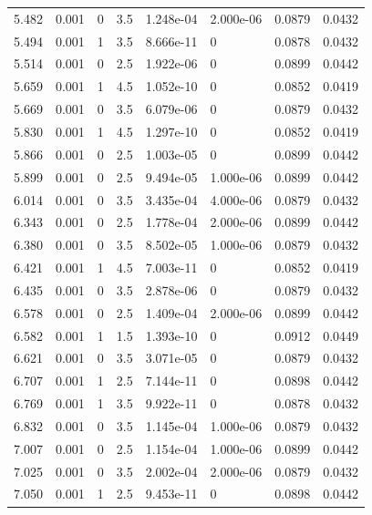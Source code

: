 \documentclass[preview]{standalone}
\begin{document}
{{{\begin{tabular}{L{1.2cm}C{1.2cm} C{0.3cm}C{0.5cm} C{1.4cm}C{1.4cm} C{1.4cm}C{1.4cm}}
  5.482  &  0.001  & 0     & 3.5 &  1.248e-04  & 2.000e-06  & 0.0879 &  0.0432   \\ 
  5.494  &  0.001  & 1     & 3.5 &  8.666e-11  & 0  & 0.0878 &  0.0432   \\ 
  5.514  &  0.001  & 0     & 2.5 &  1.922e-06  & 0  & 0.0899 &  0.0442   \\ 
  5.659  &  0.001  & 1     & 4.5 &  1.052e-10  & 0  & 0.0852 &  0.0419   \\ 
  5.669  &  0.001  & 0     & 3.5 &  6.079e-06  & 0  & 0.0879 &  0.0432   \\ 
  5.830  &  0.001  & 1     & 4.5 &  1.297e-10  & 0  & 0.0852 &  0.0419   \\ 
  5.866  &  0.001  & 0     & 2.5 &  1.003e-05  & 0  & 0.0899 &  0.0442   \\ 
  5.899  &  0.001  & 0     & 2.5 &  9.494e-05  & 1.000e-06  & 0.0899 &  0.0442   \\ 
  6.014  &  0.001  & 0     & 3.5 &  3.435e-04  & 4.000e-06  & 0.0879 &  0.0432   \\ 
  6.343  &  0.001  & 0     & 2.5 &  1.778e-04  & 2.000e-06  & 0.0899 &  0.0442   \\ 
  6.380  &  0.001  & 0     & 3.5 &  8.502e-05  & 1.000e-06  & 0.0879 &  0.0432   \\ 
  6.421  &  0.001  & 1     & 4.5 &  7.003e-11  & 0  & 0.0852 &  0.0419   \\ 
  6.435  &  0.001  & 0     & 3.5 &  2.878e-06  & 0  & 0.0879 &  0.0432   \\ 
  6.578  &  0.001  & 0     & 2.5 &  1.409e-04  & 2.000e-06  & 0.0899 &  0.0442   \\ 
  6.582  &  0.001  & 1     & 1.5 &  1.393e-10  & 0  & 0.0912 &  0.0449   \\ 
  6.621  &  0.001  & 0     & 3.5 &  3.071e-05  & 0  & 0.0879 &  0.0432   \\ 
  6.707  &  0.001  & 1     & 2.5 &  7.144e-11  & 0  & 0.0898 &  0.0442   \\ 
  6.769  &  0.001  & 1     & 3.5 &  9.922e-11  & 0  & 0.0878 &  0.0432   \\ 
  6.832  &  0.001  & 0     & 3.5 &  1.145e-04  & 1.000e-06  & 0.0879 &  0.0432   \\ 
  7.007  &  0.001  & 0     & 2.5 &  1.154e-04  & 1.000e-06  & 0.0899 &  0.0442   \\ 
  7.025  &  0.001  & 0     & 3.5 &  2.002e-04  & 2.000e-06  & 0.0879 &  0.0432   \\ 
  7.050  &  0.001  & 1     & 2.5 &  9.453e-11  & 0  & 0.0898 &  0.0442   \\ 

\end{tabular}}}}
\end{document}
